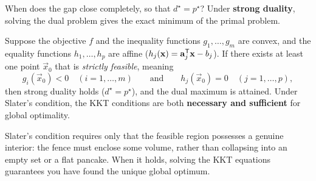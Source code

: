 When does the gap close completely, so that $d^\star = p^\star$? Under \textbf{strong duality}, solving the dual problem gives the exact minimum of the primal problem.

\begin{theorem}
\label{ch36:thm-slater}
Suppose the objective $f$ and the inequality functions $g_1,\dots,g_m$ are convex, and the equality functions $h_1,\dots,h_p$ are affine ($h_j(\mathbf{x}) = \mathbf{a}_j^{\mathsf{T}}\mathbf{x} - b_j$). If there exists at least one point $\vec{x}_0$ that is \emph{strictly feasible}, meaning
\[
  g_i(\vec{x}_0) < 0 \quad (i = 1, \dots, m) \qquad \text{and} \qquad h_j(\vec{x}_0) = 0 \quad (j = 1, \dots, p),
\]
then strong duality holds ($d^\star = p^\star$), and the dual maximum is attained. Under Slater's condition, the KKT conditions are both \textbf{necessary and sufficient} for global optimality.
\end{theorem}

Slater's condition requires only that the feasible region possesses a genuine interior: the fence must enclose some volume, rather than collapsing into an empty set or a flat pancake. When it holds, solving the KKT equations guarantees you have found the unique global optimum.

